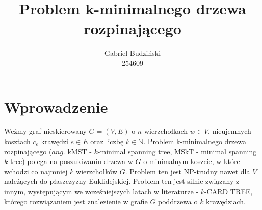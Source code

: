\documentclass{article}
\title{Problem k-minimalnego drzewa rozpinającego}
\author{Gabriel Budziński\\254609}
\begin{document}
\maketitle

\section{Wprowadzenie}

Weźmy graf nieskierowany $G=(V,E)$ o $n$ wierzchołkach $w \in V$, nieujemnych kosztach $c_e$ krawędzi $e \in E$ oraz liczbę $k \in \mathbb{N}$. Problem k-minimalnego drzewa rozpinającego ($\textit{ang.}$ kMST - $k$-minimal spanning tree, MSkT - minimal spanning $k$-tree) polega na poszukiwaniu drzewa w $G$ o minimalnym koszcie, w które wchodzi co najmniej $k$ wierzchołków $G$. Problem ten jest NP-trudny nawet dla $V$ należących do płaszczyzny Euklidejskiej. Problem ten jest silnie związany z innym, występującym we wcześniejszych latach w literaturze \cite{k_card_trees} - $k$-CARD TREE, którego rozwiązaniem jest znalezienie w grafie $G$ poddrzewa o $k$ krawędziach.


\newpage



\end{document}
